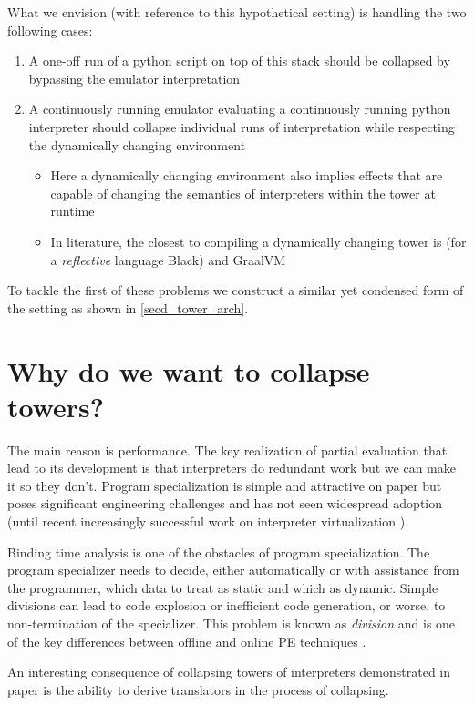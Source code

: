 \documentclass[fleqn]{article}
\theoremstyle{definition}
\begin{document}
What we envision (with reference to this hypothetical setting) is handling the two following cases:
\begin{enumerate}
	\item A one-off run of a python script on top of this stack should be collapsed by bypassing the emulator interpretation
	\item A continuously running emulator evaluating a continuously running python interpreter should collapse individual runs of interpretation while respecting the dynamically changing environment
	\begin{itemize}
		\item Here a dynamically changing environment also implies effects that are capable of changing the semantics of interpreters within the tower at runtime
		\item In literature, the closest to compiling a dynamically changing tower is \cite{asai1997partial, amin2017collapsing} (for a \textit{reflective} language Black) and GraalVM \cite{wurthinger2013one}
	\end{itemize}
\end{enumerate}
To tackle the first of these problems we construct a similar yet condensed form of the setting as shown in \ref{secd_tower_arch}.

\section{Why do we want to collapse towers?}
The main reason is performance. The key realization of partial evaluation that lead to its development is that interpreters do redundant work but we can make it so they don't. Program specialization is simple and attractive on paper but poses significant engineering challenges and has not seen widespread adoption (until recent increasingly successful work on interpreter virtualization \cite{wurthinger2013one}).

Binding time analysis is one of the obstacles of program specialization. The program specializer needs to decide, either automatically or with assistance from the programmer, which data to treat as static and which as dynamic. Simple divisions
can lead to code explosion or inefficient code generation, or worse, to non-termination of the specializer. This problem is known as \textit{division} and is one of the key differences between offline and online PE techniques \cite{jones1993partial}.

An interesting consequence of collapsing towers of interpreters demonstrated in \cite{amin2017collapsing} paper is the ability to derive translators in the process of collapsing.
\end{document}
